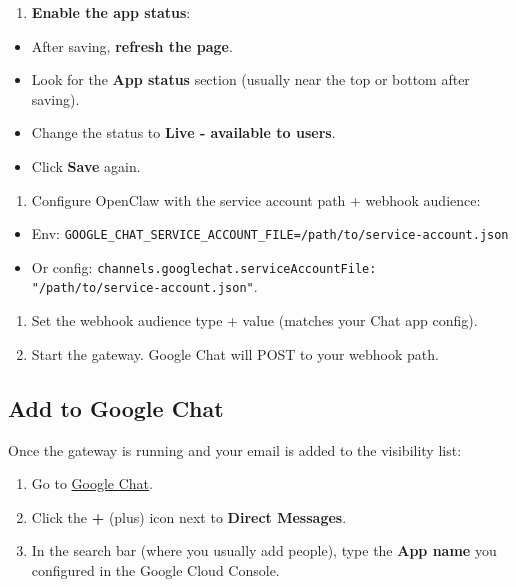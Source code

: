 \begin{enumerate}
  \item \textbf{Enable the app status}:
\end{enumerate}

\begin{itemize}
  \item After saving, \textbf{refresh the page}.
  \item Look for the \textbf{App status} section (usually near the top or bottom after saving).
  \item Change the status to \textbf{Live - available to users}.
  \item Click \textbf{Save} again.
\end{itemize}

\begin{enumerate}
  \item Configure OpenClaw with the service account path + webhook audience:
\end{enumerate}

\begin{itemize}
  \item Env: \texttt{GOOGLE\_CHAT\_SERVICE\_ACCOUNT\_FILE=/path/to/service-account.json}
  \item Or config: \texttt{channels.googlechat.serviceAccountFile: "/path/to/service-account.json"}.
\end{itemize}

\begin{enumerate}
  \item Set the webhook audience type + value (matches your Chat app config).
  \item Start the gateway. Google Chat will POST to your webhook path.
\end{enumerate}


\subsection{Add to Google Chat}


Once the gateway is running and your email is added to the visibility list:

\begin{enumerate}
  \item Go to \href{https://chat.google.com/}{Google Chat}.
  \item Click the \textbf{+} (plus) icon next to \textbf{Direct Messages}.
  \item In the search bar (where you usually add people), type the \textbf{App name} you configured in the Google Cloud Console.
\end{enumerate}

